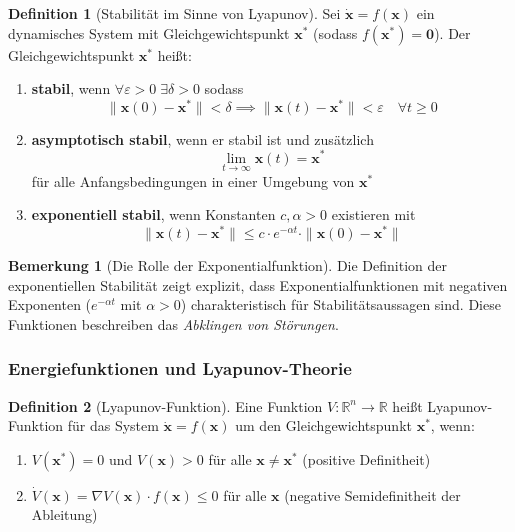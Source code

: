﻿\documentclass[a4paper,12pt]{scrreprt}
\theoremstyle{definition}
\newtheorem{definition}{Definition}[section]
\newtheorem{bemerkung}{Bemerkung}[section]
\begin{document}
\begin{definition}[Stabilität im Sinne von Lyapunov]
	Sei $\dot{\mathbf{x}} = f(\mathbf{x})$ ein dynamisches System mit Gleichgewichtspunkt $\mathbf{x}^*$ (sodass $f(\mathbf{x}^*) = \mathbf{0}$). Der Gleichgewichtspunkt $\mathbf{x}^*$ heißt:
	\begin{enumerate}
		\item[-] \textbf{stabil}, wenn $\forall \varepsilon > 0 \; \exists \delta > 0$ sodass
		\begin{equation}
			\|\mathbf{x}(0) - \mathbf{x}^*\| < \delta \implies \|\mathbf{x}(t) - \mathbf{x}^*\| < \varepsilon \quad \forall t \geq 0
		\end{equation}
		
		\item[-] \textbf{asymptotisch stabil}, wenn er stabil ist und zusätzlich
		\begin{equation}
			\lim_{t \to \infty} \mathbf{x}(t) = \mathbf{x}^* 
		\end{equation}
		für alle Anfangsbedingungen in einer Umgebung von $\mathbf{x}^*$
		
		\item[-] \textbf{exponentiell stabil}, wenn Konstanten $c, \alpha > 0$ existieren mit
		\begin{equation}
			\|\mathbf{x}(t) - \mathbf{x}^*\| \leq c \cdot e^{-\alpha t} \cdot \|\mathbf{x}(0) - \mathbf{x}^*\|
		\end{equation}
	\end{enumerate}
\end{definition}

\begin{bemerkung}[Die Rolle der Exponentialfunktion]
	Die Definition der exponentiellen Stabilität zeigt explizit, dass Exponentialfunktionen mit negativen Exponenten ($e^{-\alpha t}$ mit $\alpha > 0$) charakteristisch für Stabilitätsaussagen sind. Diese Funktionen beschreiben das \textit{Abklingen von Störungen}.
\end{bemerkung}

\subsubsection{Energiefunktionen und Lyapunov-Theorie}

\begin{definition}[Lyapunov-Funktion]
	Eine Funktion $V: \mathbb{R}^n \to \mathbb{R}$ heißt Lyapunov-Funktion für das System $\dot{\mathbf{x}} = f(\mathbf{x})$ um den Gleichgewichtspunkt $\mathbf{x}^*$, wenn:
	\begin{enumerate}
		\item[-] $V(\mathbf{x}^*) = 0$ und $V(\mathbf{x}) > 0$ für alle $\mathbf{x} \neq \mathbf{x}^*$ (positive Definitheit)
		\item[-] $\dot{V}(\mathbf{x}) = \nabla V(\mathbf{x}) \cdot f(\mathbf{x}) \leq 0$ für alle $\mathbf{x}$ (negative Semidefinitheit der Ableitung)
	\end{enumerate}
\end{definition}
\end{document}
